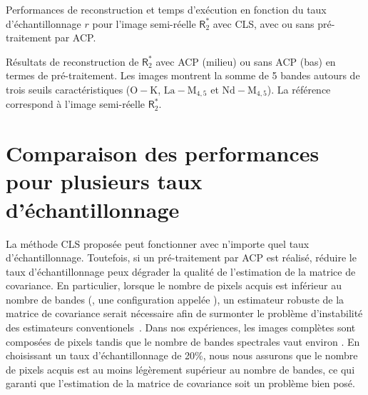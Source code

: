 \begin{normalfigure*}[]
    \hspace{1cm}
    \caption{Performances de reconstruction et temps d'exécution en fonction du taux d'échantillonnage $r$ pour l'image semi-réelle $\mathsf{R}_2^*$ avec CLS,  avec ou sans pré-traitement par ACP.
        \protect\label{fig-CLS-full}}
\end{normalfigure*}

\begin{normalfigure*}[]
    \centering
    
    \caption{Résultats de reconstruction de $\mathsf{R}_2^*$ avec ACP (milieu) ou sans ACP (bas) en termes de pré-traitement. Les images montrent la somme de 5 bandes autours de trois seuils caractéristiques ($\mathrm{O-K}$, $\mathrm{La-M}_{4, 5}$ et $\mathrm{Nd-M}_{4, 5}$). La référence correspond à l'image semi-réelle $\mathsf{R}_2^*$.
        \protect\label{fig-CLS-full-images}}
\end{normalfigure*}



\section{Comparaison des performances pour plusieurs taux d'échantillonnage}\label{sec-autres-taux-echantillonnage-hr}

La méthode CLS proposée peut fonctionner avec n'importe quel taux d'échantillonnage. Toutefois, si un pré-traitement par ACP est réalisé, réduire le taux d'échantillonnage peux dégrader la qualité de l'estimation de la matrice de covariance. En particulier, lorsque le nombre de pixels acquis est inférieur au nombre de bandes (\ie{}, une configuration appelée ), un estimateur robuste de la matrice de covariance serait nécessaire afin de surmonter le problème d'instabilité des estimateurs conventionels~\cite{ledoit2004well}. Dans nos expériences, les images complètes sont composées de  pixels tandis que le nombre de bandes spectrales vaut environ . En choisissant un taux d'échantillonnage de 20\%, nous nous assurons que le nombre de pixels acquis est au moins légèrement supérieur au nombre de bandes, ce qui garanti que l'estimation de la matrice de covariance soit un problème bien posé.

